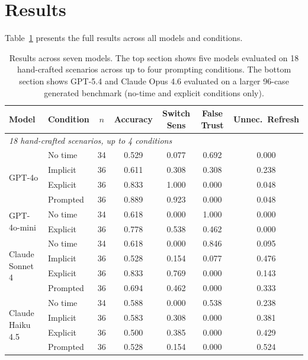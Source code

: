 \documentclass[11pt,a4paper]{article}
\begin{document}
\section{Results}
\label{sec:results}

Table~\ref{tab:frontier} presents the full results across all models and conditions.

\begin{table}[t]
\centering
\caption{Results across seven models. The top section shows five models evaluated on 18 hand-crafted scenarios across up to four prompting conditions. The bottom section shows GPT-5.4 and Claude Opus 4.6 evaluated on a larger 96-case generated benchmark (no-time and explicit conditions only).}
\label{tab:frontier}
\small
\begin{tabular}{llccccc}
\toprule
\textbf{Model} & \textbf{Condition} & \textbf{$n$} & \textbf{Accuracy} & \textbf{Switch Sens} & \textbf{False Trust} & \textbf{Unnec.\ Refresh} \\
\midrule
\multicolumn{7}{l}{\emph{18 hand-crafted scenarios, up to 4 conditions}} \\
\midrule
\multirow{4}{*}{GPT-4o}
  & No time   & 34  & 0.529 & 0.077 & 0.692 & 0.000 \\
  & Implicit  & 36  & 0.611 & 0.308 & 0.308 & 0.238 \\
  & Explicit  & 36  & 0.833 & 1.000 & 0.000 & 0.048 \\
  & Prompted  & 36  & 0.889 & 0.923 & 0.000 & 0.048 \\
\midrule
\multirow{2}{*}{GPT-4o-mini}
  & No time   & 34  & 0.618 & 0.000 & 1.000 & 0.000 \\
  & Explicit  & 36  & 0.778 & 0.538 & 0.462 & 0.000 \\
\midrule
\multirow{4}{*}{Claude Sonnet 4}
  & No time   & 34  & 0.618 & 0.000 & 0.846 & 0.095 \\
  & Implicit  & 36  & 0.528 & 0.154 & 0.077 & 0.476 \\
  & Explicit  & 36  & 0.833 & 0.769 & 0.000 & 0.143 \\
  & Prompted  & 36  & 0.694 & 0.462 & 0.000 & 0.333 \\
\midrule
\multirow{4}{*}{Claude Haiku 4.5}
  & No time   & 34  & 0.588 & 0.000 & 0.538 & 0.238 \\
  & Implicit  & 36  & 0.583 & 0.308 & 0.000 & 0.381 \\
  & Explicit  & 36  & 0.500 & 0.385 & 0.000 & 0.429 \\
  & Prompted  & 36  & 0.528 & 0.154 & 0.000 & 0.524 \\

\end{tabular}
\end{table}
\end{document}
